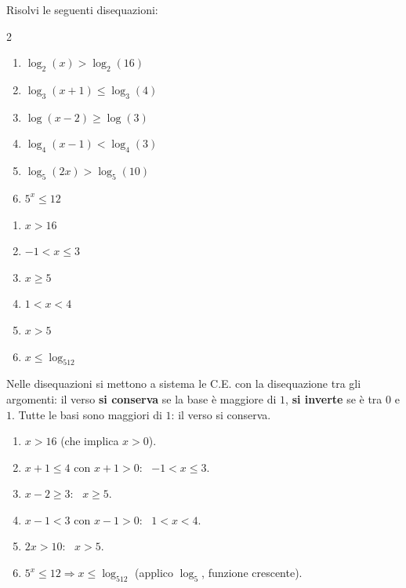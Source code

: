 
\begin{question}[ID=3.3, subtitle={Disequazioni logaritmiche per confronto}, difficulty=media, tags={disequazioni logaritmiche, confronto}]
Risolvi le seguenti disequazioni:
\begin{center}\begin{minipage}{0.92\linewidth}
\begin{multicols}{2}
\begin{enumerate}[leftmargin=3.2cm]
\item $\log_2(x) > \log_2(16)$
\item $\log_3(x+1) \le \log_3(4)$
\item $\log(x-2) \ge \log(3)$
\item $\log_4(x-1) < \log_4(3)$
\item $\log_5(2x) > \log_5(10)$
\item $5^x \le 12$
\end{enumerate}
\end{multicols}
\end{minipage}\end{center}
\begin{solution}
\begin{enumerate}
    \item $x>16$
    \item $-1<x\leq3$
    \item $x\geq5$
    \item $1<x<4$
    \item $x>5$
    \item $x\leq\log_512$
\end{enumerate}
\end{solution}
\begin{explanation}
Nelle disequazioni si mettono a sistema le C.E. con la disequazione tra gli argomenti: il verso \textbf{si conserva} se la base è maggiore di $1$, \textbf{si inverte} se è tra $0$ e $1$.
Tutte le basi sono maggiori di $1$: il verso si conserva.
\begin{enumerate}
    \item $x>16$ (che implica $x>0$).
    \item $x+1\leq4$ con $x+1>0$: \ $-1<x\leq3$.
    \item $x-2\geq3$: \ $x\geq5$.
    \item $x-1<3$ con $x-1>0$: \ $1<x<4$.
    \item $2x>10$: \ $x>5$.
    \item $5^x\leq12 \Rightarrow x\leq\log_512$ (applico $\log_5$, funzione crescente).
\end{enumerate}
\end{explanation}
\end{question}

